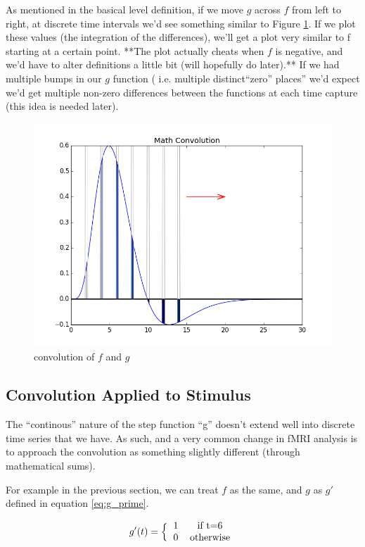 \documentclass[11pt]{article}
\begin{document}
As mentioned in the basical level definition, if we move $g$ across $f$ from left to right, at discrete time intervals we'd see something similar to Figure \ref{fig:math}. If we plot these values (the integration of the differences), we'll get a plot very similar to f starting at a certain point.  **The plot actually cheats when $f$ is negative, and we'd have to alter definitions a little bit (will hopefully do later).**  If we had multiple bumps in our $g$ function ( i.e. multiple distinct``zero'' places'' we'd expect we'd get multiple non-zero differences between the functions at each time capture (this idea is needed later). 





\begin{figure}[ht]
	\centering
	\includegraphics[width=.5\linewidth]{images/math_convolved.png}
	\caption{convolution of $f$ and $g$}
	\label{fig:math}
\end{figure}






\subsection{Convolution Applied to Stimulus}

The ``continous'' nature of the step function ``g'' doesn't extend well into discrete time series that we have. As such, and a very common change in fMRI analysis is to approach the convolution as something slightly different (through mathematical sums).  

For example in the previous section, we can treat $f$ as the same, and $g$ as $g'$ defined in equation \ref{eq:g_prime}.

\begin{equation}\label{eq:g_prime}
 g'(t)=\Big \{ \begin{tabular}{l c}
 		1  & if t=6\\
 		0  & otherwise \\
 		\end{tabular} \end{equation}
\end{document}
